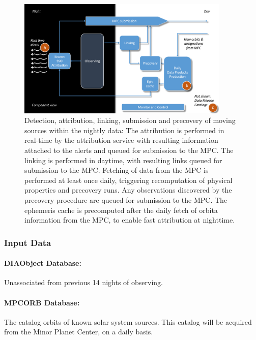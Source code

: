 \begin{figure}[th]
\begin{center}
\includegraphics[width=0.9\textwidth]{figures/solarsystempipeline.pdf}
\caption{\label{fig:apMOPS} Detection, attribution, linking, submission and precovery of moving sources within the nightly data: The attribution is performed in real-time by the attribution service with resulting information attached to the alerts and queued for submission to the MPC. The linking is performed in daytime, with resulting links queued for submission to the MPC. Fetching of data from the MPC is performed at least once daily, triggering recomputation of physical properties and precovery runs. Any observations discovered by the precovery procedure are queued for submission to the MPC. The ephemeris cache is precomputed after the daily fetch of orbita information from the MPC, to enable fast attribution at nighttime.}
\end{center}
\end{figure}

\subsubsection{Input Data}

\paragraph*{DIAObject Database: } Unassociated \DIASources from previous 14 nights of observing.

\paragraph*{MPCORB Database: } The catalog orbits of known solar system sources. This catalog will be acquired from the Minor Planet Center, on a daily basis.


